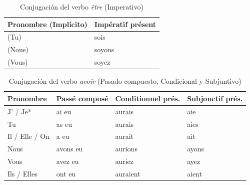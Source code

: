 \documentclass[a4paper, 12pt]{article}
\begin{document}
\vspace{0.5cm}

\begin{table}[htpb]
\centering
\begin{tabular}{|l|l|}
\hline
\textbf{Pronombre (Implícito)} & \textbf{Impératif présent} \\ \hline
(Tu) & sois \\ \hline
(Nous) & soyons \\ \hline
(Vous) & soyez \\ \hline
\end{tabular}
\caption{Conjugación del verbo \textit{être} (Imperativo)}
\end{table}

\begin{table}[htpb]
\centering
\begin{tabular}{|l|l|l|l|}
\hline
\textbf{Pronombre} & \textbf{Passé composé} & \textbf{Conditionnel prés.} & \textbf{Subjonctif prés.} \\ \hline
J' / Je* & ai eu & aurais & aie \\ \hline
Tu & as eu & aurais & aies \\ \hline
Il / Elle / On & a eu & aurait & ait \\ \hline
Nous & avons eu & aurions & ayons \\ \hline
Vous & avez eu & auriez & ayez \\ \hline
Ils / Elles & ont eu & auraient & aient \\ \hline
\end{tabular}
\caption{Conjugación del verbo \textit{avoir} (Pasado compuesto, Condicional y Subjuntivo)}
\end{table}
\end{document}
